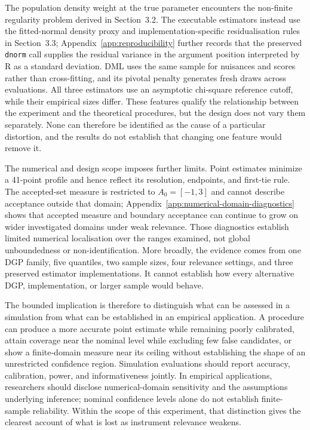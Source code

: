 The population density weight at the true parameter encounters the non-finite regularity problem derived in Section~3.2. The executable estimators instead use the fitted-normal density proxy and implementation-specific residualisation rules in Section~3.3; Appendix~\ref{app:reproducibility} further records that the preserved \texttt{dnorm} call supplies the residual variance in the argument position interpreted by R as a standard deviation. DML uses the same sample for nuisances and scores rather than cross-fitting, and its pivotal penalty generates fresh draws across evaluations. All three estimators use an asymptotic chi-square reference cutoff, while their empirical sizes differ. These features qualify the relationship between the experiment and the theoretical procedures, but the design does not vary them separately. None can therefore be identified as the cause of a particular distortion, and the results do not establish that changing one feature would remove it.

The numerical and design scope imposes further limits. Point estimates minimize a 41-point profile and hence reflect its resolution, endpoints, and first-tie rule. The accepted-set measure is restricted to $A_0=[-1,3]$ and cannot describe acceptance outside that domain; Appendix~\ref{app:numerical-domain-diagnostics} shows that accepted measure and boundary acceptance can continue to grow on wider investigated domains under weak relevance. Those diagnostics establish limited numerical localisation over the ranges examined, not global unboundedness or non-identification. More broadly, the evidence comes from one DGP family, five quantiles, two sample sizes, four relevance settings, and three preserved estimator implementations. It cannot establish how every alternative DGP, implementation, or larger sample would behave.

The bounded implication is therefore to distinguish what can be assessed in a simulation from what can be established in an empirical application. A procedure can produce a more accurate point estimate while remaining poorly calibrated, attain coverage near the nominal level while excluding few false candidates, or show a finite-domain measure near its ceiling without establishing the shape of an unrestricted confidence region. Simulation evaluations should report accuracy, calibration, power, and informativeness jointly. In empirical applications, researchers should disclose numerical-domain sensitivity and the assumptions underlying inference; nominal confidence levels alone do not establish finite-sample reliability. Within the scope of this experiment, that distinction gives the clearest account of what is lost as instrument relevance weakens.
